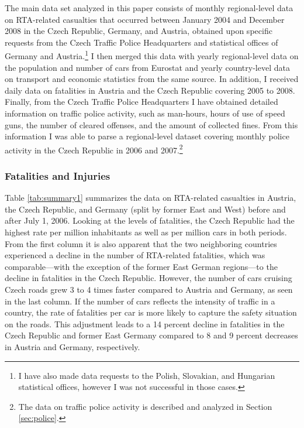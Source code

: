 \documentclass[12pt]{article}
\begin{document}
The main data set analyzed in this paper consists of monthly regional-level data
on RTA-related casualties that occurred between January 2004 and December 2008
in the Czech Republic, Germany, and Austria, obtained upon specific requests
from the Czech Traffic Police Headquarters and statistical offices of Germany
and Austria.\footnote{I have also made data requests to the Polish, Slovakian,
  and Hungarian statistical offices, however I was not successful in those
  cases.} I then merged this data with yearly regional-level data on the
population and number of cars from Eurostat and yearly country-level data on
transport and economic statistics from the same source. In addition, I received
daily data on fatalities in Austria and the Czech Republic covering 2005 to
2008.  Finally, from the Czech Traffic Police Headquarters I have obtained
detailed information on traffic police activity, such as man-hours, hours of use
of speed guns, the number of cleared offenses, and the amount of collected
fines. From this information I was able to parse a regional-level dataset
covering monthly police activity in the Czech Republic in 2006 and
2007.\footnote{The data on traffic police activity is described and analyzed in
  Section \ref{sec:police}.}

\subsubsection{Fatalities and Injuries} %

Table \ref{tab:summary1} summarizes the data on RTA-related casualties in
Austria, the Czech Republic, and Germany (split by former East and West) before
and after July 1, 2006. Looking at the levels of fatalities, the Czech Republic
had the highest rate per million inhabitants as well as per million cars in both
periods. From the first column it is also apparent that the two neighboring
countries experienced a decline in the number of RTA-related fatalities, which
was comparable---with the exception of the former East German regions---to the
decline in fatalities in the Czech Republic. However, the number of cars
cruising Czech roads grew 3 to 4 times faster compared to Austria and Germany,
as seen in the last column. If the number of cars reflects the intensity of
traffic in a country, the rate of fatalities per car is more likely to capture
the safety situation on the roads. This adjustment leads to a 14 percent decline
in fatalities in the Czech Republic and former East Germany compared to 8 and 9
percent decreases in Austria and Germany, respectively.  
\end{document}
